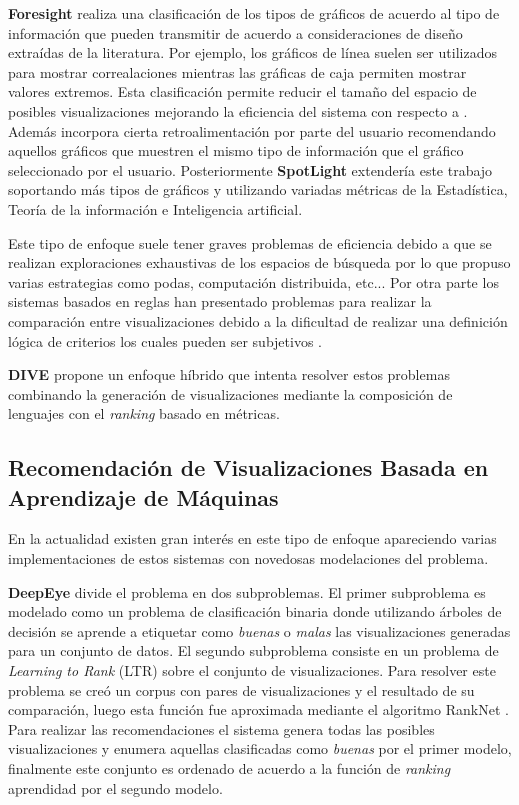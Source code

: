 \textbf{Foresight} \cite{demiralp2017foresight} realiza una clasificaci\'on de los tipos de gr\'aficos de
acuerdo al tipo de informaci\'on que pueden transmitir de acuerdo a consideraciones de dise\~no extra\'idas
de la literatura. Por ejemplo, los gr\'aficos de l\'inea suelen ser utilizados para mostrar correalaciones
mientras las gr\'aficas de caja permiten mostrar valores extremos. Esta clasificaci\'on permite reducir el tama\~no
del espacio de posibles visualizaciones mejorando la eficiencia del sistema con respecto a \cite{seo2004rank}.
Adem\'as incorpora cierta retroalimentaci\'on por
parte del usuario recomendando aquellos gr\'aficos que muestren el mismo tipo de informaci\'on que el gr\'afico
seleccionado por el usuario. Posteriormente \textbf{SpotLight} \cite{harris2021insight} extender\'ia este trabajo soportando
m\'as tipos de gr\'aficos y utilizando variadas m\'etricas de la Estad\'istica, Teor\'ia de la informaci\'on e Inteligencia artificial.

Este tipo de enfoque suele tener graves problemas de eficiencia debido a que se realizan exploraciones exhaustivas de los
espacios de b\'usqueda por lo que \cite{vartak2014seedb} propuso varias estrategias como podas, computaci\'on distribuida, etc...
Por otra parte los sistemas basados en reglas han presentado problemas para realizar la comparaci\'on entre visualizaciones debido
a la dificultad de realizar una definici\'on l\'ogica de criterios los cuales pueden ser subjetivos \cite{vartak2017towards}.

\textbf{DIVE} \cite{hu2018dive} propone un enfoque h\'ibrido que intenta resolver estos problemas combinando
la generaci\'on de visualizaciones mediante la composici\'on de lenguajes con el \textit{ranking} basado en m\'etricas. 

\subsection{Recomendaci\'on de Visualizaciones Basada en Aprendizaje de M\'aquinas}\label{subsection:ml-viz-rec}
En la actualidad existen gran inter\'es en este tipo de enfoque apareciendo varias implementaciones
de estos sistemas con novedosas modelaciones del problema. 

\textbf{DeepEye} \cite{luo2018deepeye} divide el problema en dos subproblemas. El primer subproblema es modelado
como un problema de clasificaci\'on binaria donde utilizando \'arboles de decisi\'on se aprende a etiquetar 
como \textit{buenas} o \textit{malas} las visualizaciones generadas para un conjunto de datos. 
El segundo subproblema consiste en un problema de \textit{Learning to Rank} (LTR) sobre el conjunto de visualizaciones. 
Para resolver este problema se cre\'o un corpus con pares de visualizaciones y el resultado de su comparaci\'on, luego esta funci\'on fue aproximada
mediante el algoritmo RankNet \cite{luo2018deepeye}. Para realizar las recomendaciones el sistema genera todas las posibles visualizaciones y enumera
aquellas clasificadas como \textit{buenas} por el primer modelo, finalmente este conjunto es ordenado de acuerdo a la funci\'on de \textit{ranking} aprendidad por
el segundo modelo. 

